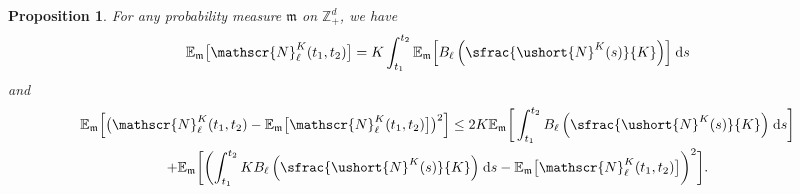\documentclass[10pt]{amsart}
\let\mathcal\mathscr
\numberwithin{equation}{section}
\theoremstyle{plain}
\newtheorem{proposition}[theorem]{Proposition}
\theoremstyle{definition}
\newcommand{\E}{{\mathbb{E}}}
\newcommand{\zentiers}{{\mathbb{Z}}}
\newcommand{\domaine}{\zentiers_{+}^{d}}
\newcommand{\sK}{K}
\newcommand{\leproc}{\ushort{N}^{K}}
\newcommand{\dd}{\hspace{1pt}\mathrm{d}}
\begin{document}
\begin{proposition}\label{prop-rentree}
For any probability measure $\mathfrak{m}$ on $\domaine$, we have
\[
\E_{\mathfrak{m}}\bigl[\mathcal{N}^{\sK}_\ell(t_{1},t_{2}) \bigr]=
K \int_{t_{1}}^{t_{2}} \E_{\mathfrak{m}}\!\left[B_{\ell}\left(\sfrac{\leproc(s)}{K}\right)\right] \dd s
\]
and
\begin{multline*}
\E_{\mathfrak{m}} \Bigl[\bigl(\mathcal{N}^{\sK}_\ell(t_{1},t_{2})
- \E_{\mathfrak{m}}\bigl[\mathcal{N}^{\sK}_\ell(t_{1},t_{2})\bigr] \bigr)^2 \Bigr]
\leq 2K\E_{\mathfrak{m}}\!\left[\,\int_{t_{1}}^{t_{2}} B_{\ell}\left(\sfrac{\leproc(s)}{K}\right) \dd s \right]\\
+ \E_{\mathfrak{m}} \biggl[\biggl(\int_{t_{1}}^{t_{2}} K B_{\ell}\left(\sfrac{\leproc(s)}{K}\right) \dd s
- \E_{\mathfrak{m}}\bigl[\mathcal{N}^{\sK}_\ell(t_{1},t_{2})\bigr] \biggr)^2\biggr].
\end{multline*}
\end{proposition}
\end{document}
